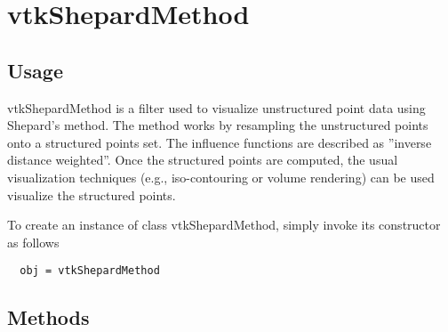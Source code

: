 \section{vtkShepardMethod}

\subsection{Usage}

 vtkShepardMethod is a filter used to visualize unstructured point data using
 Shepard's method. The method works by resampling the unstructured points 
 onto a structured points set. The influence functions are described as 
 ''inverse distance weighted''. Once the structured points are computed, the 
 usual visualization techniques (e.g., iso-contouring or volume rendering)
 can be used visualize the structured points.

To create an instance of class vtkShepardMethod, simply
invoke its constructor as follows
\begin{verbatim}
  obj = vtkShepardMethod
\end{verbatim}
\subsection{Methods}

